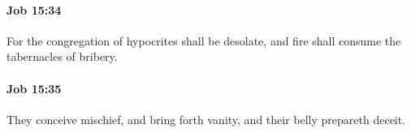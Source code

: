 		\paragraph{Job 15:34} %
			\label{JOB-15-34}

			For the congregation of hypocrites shall be desolate, and fire shall consume the tabernacles of bribery.


		\paragraph{Job 15:35} %
			\label{JOB-15-35}

			They conceive mischief, and bring forth vanity, and their belly prepareth deceit.

